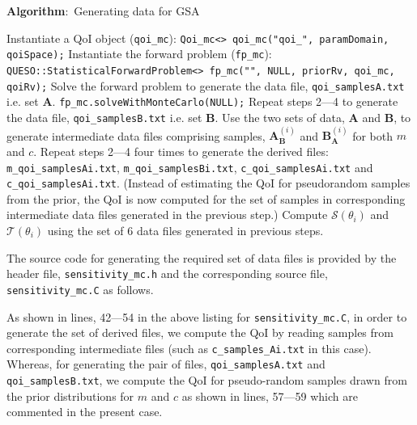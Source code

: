 \begin{algorithm}
\caption*{\textbf{Algorithm}:~Generating data for GSA}
\begin{algorithmic}[1]
\BState Instantiate a QoI object (\texttt{qoi\_mc}): 
\Statex \texttt{Qoi\_mc<> qoi\_mc("qoi\_", paramDomain, qoiSpace);}
\BState Instantiate the forward problem (\texttt{fp\_mc}):
\Statex \texttt{QUESO::StatisticalForwardProblem<> fp\_mc("", NULL, priorRv, qoi\_mc, qoiRv);} 
\BState Solve the forward problem to generate the data file, \texttt{qoi\_samplesA.txt} i.e. set $\bm A$. 
\Statex \texttt{fp\_mc.solveWithMonteCarlo(NULL);}
\BState Repeat steps 2---4 to generate the data file, \texttt{qoi\_samplesB.txt} i.e. set $\bm B$. 
\BState Use the two sets of data, $\bm A$ and $\bm B$, to generate intermediate data files comprising samples,
$\bm{A}^{(i)}_{\bm B}$ and $\bm{B}^{(i)}_{\bm A}$ for both $m$ and $c$. 
\BState Repeat steps 2---4 four times to generate the derived files: \texttt{m\_qoi\_samplesAi.txt}, 
\texttt{m\_qoi\_samplesBi.txt}, \texttt{c\_qoi\_samplesAi.txt} and \texttt{c\_qoi\_samplesAi.txt}. (Instead
of estimating the QoI for pseudorandom samples from the prior, the QoI is now computed for the set of samples in
corresponding intermediate data files generated in the previous step.)
\BState Compute $\mathcal{S}(\theta_{i})$ and $\mathcal{T}(\theta_{i})$ using the set of 6 data files generated
in previous steps.  
\EndProcedure
\end{algorithmic}
\end{algorithm}

The source code for generating the required set of data files is provided by the header file,
\texttt{sensitivity\_mc.h} and the corresponding source file, \texttt{sensitivity\_mc.C} as follows. 

 


 
 
As shown in lines, 42---54 in the  above listing for \texttt{sensitivity\_mc.C}, in order to generate the set of derived files,
we compute the QoI by reading samples from corresponding intermediate files (such as \texttt{c\_samples\_Ai.txt} in this case).
Whereas, for generating the pair of files, \texttt{qoi\_samplesA.txt} and \texttt{qoi\_samplesB.txt}, we compute the QoI
for pseudo-random samples drawn from the prior distributions for $m$ and $c$ as shown in lines, 57---59 which are commented in
the present case. 


